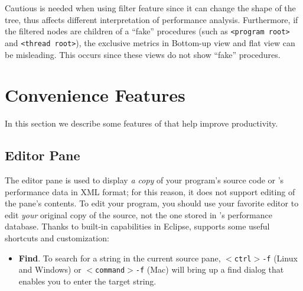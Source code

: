Cautious is needed when using filter feature since it can change the shape of the tree, thus affects different interpretation of performance analysis.
Furthermore, if the filtered nodes are children of a ``fake'' procedures (such as \texttt{<program root>} and \texttt{<thread root>}), the exclusive metrics in Bottom-up view and flat view can be misleading.
This occurs since these views do not show ``fake'' procedures.



\section{Convenience Features}

In this section we describe some features of \hpcviewer{} that help improve productivity.


\subsection{Editor Pane}

The editor pane is used to display \textit{a copy} of your program's source code or \HPCToolkit{}'s performance data in XML format; for this reason, it does not support editing of the pane's contents.
To edit your program, you should use your favorite editor to edit \textit{your} original copy of the source, not the one stored in \HPCToolkit{}'s performance database.
Thanks to built-in capabilities in Eclipse, \hpcviewer{} supports some useful shortcuts and customization:
\begin{itemize}

\item \textbf{Find}.
  To search for a string in the current source pane, \texttt{$<$ctrl$>$-f} (Linux and Windows) or \texttt{$<$command$>$-f} (Mac) will bring up a find dialog that enables you to enter the target string.

\end{itemize}



